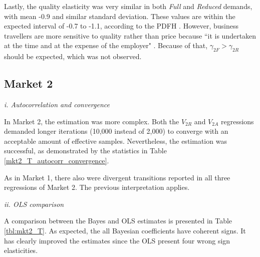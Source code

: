Lastly, the quality elasticity was very similar in both \textit{Full} and \textit{Reduced} demands, with mean -0.9 and similar standard deviation. These values are within the expected interval of -0.7 to -1.1, according to the PDFH \citep{pdfhv5}. However, business travellers are more sensitive to quality rather than price because ``it is undertaken at the time and at the expense of the employer" \citep[p.~1, Chapter A1]{pdfhv5}. Because of that, $\gamma_{2F} > \gamma_{2R}$ should be expected, which was not observed. 


\subsection{Market 2}

\textit{i. Autocorrelation and convergence}

In Market 2, the estimation was more complex. Both the $V_{2R}$ and $V_{2A}$ regressions demanded longer iterations (10,000 instead of 2,000) to converge with an acceptable amount of effective samples. Nevertheless, the estimation was successful, as demonstrated by the statistics in Table \ref{mkt2_T_autocorr_convergence}.

As in Market 1, there also were divergent transitions reported in all three regressions of Market 2. The previous interpretation applies.




\textit{ii. OLS comparison}

A comparison between the Bayes and OLS estimates is presented in Table \ref{tbl:mkt2_T}. As expected, the all Bayesian coefficients have coherent signs. It has clearly improved the estimates since the OLS present four wrong sign elasticities.




